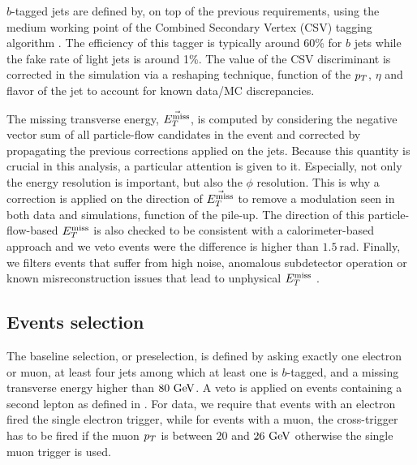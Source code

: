        $b$-tagged jets are defined by, on top of the previous requirements, using the
       medium working point of the Combined Secondary Vertex (CSV) tagging algorithm \cite{BTagging8TeV}.
       The efficiency of this tagger is typically around 60\% for $b$ jets while the fake
       rate of light jets is around 1\%. The value of the CSV discriminant is corrected in
       the simulation via a reshaping technique, function of the $p_T$, $\eta$ and flavor
       of the jet to account for known data/MC discrepancies.

       The missing transverse energy, $\vec{E_T^\text{miss}}$, is computed by considering the
       negative vector sum of all particle-flow candidates in the event and corrected by
       propagating the previous corrections applied on the jets. Because this quantity is
       crucial in this analysis, a particular attention is given to it. Especially, not only
       the energy resolution is important, but also the $\phi$ resolution. This is why
       a correction is applied on the direction of $\vec{E_T^\text{miss}}$ to remove a modulation seen in
       both data and simulations, function of the pile-up. The direction of this
       particle-flow-based $E_T^\text{miss}$ is also checked to be consistent with a calorimeter-based
       approach and we veto events were the difference is higher than $1.5~\text{rad}$.
       Finally, we filters events that suffer from high noise, anomalous subdetector operation
       or known misreconstruction issues that lead to unphysical $E_T^\text{miss}$ \cite{METperf}.

        \subsection{Events selection}

        The baseline selection, or preselection,
        is defined by asking exactly one electron or muon, at least
        four jets among which at least one is $b$-tagged, and a missing transverse energy higher than $80 ~\text{GeV}$.
        A veto is applied on events containing a second lepton as defined in .
        For data, we require that events with an electron fired the single electron
        trigger, while for events with a muon, the cross-trigger has to be fired
        if the muon $p_T$ is between $20$ and $26~\text{GeV}$ otherwise the single muon trigger
        is used.

